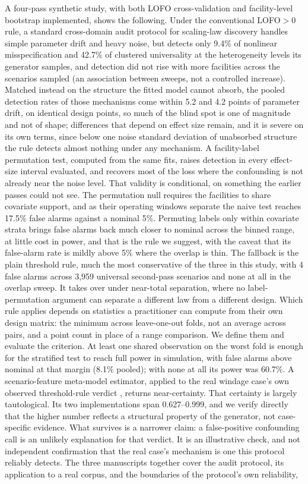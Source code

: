 \documentclass[journal=dce]{CUP-JNL-DTM}%
\begin{document}
A four-pass synthetic study, with both LOFO cross-validation and facility-level bootstrap implemented, shows the following. Under the conventional LOFO$>0$ rule, a standard cross-domain audit protocol for scaling-law discovery handles simple parameter drift and heavy noise, but detects only 9.4\% of nonlinear misspecification and 42.7\% of clustered universality at the heterogeneity levels its generator samples, and detection did not rise with more facilities across the scenarios sampled (an association between sweeps, not a controlled increase). Matched instead on the structure the fitted model cannot absorb, the pooled detection rates of those mechanisms come within 5.2 and 4.2 points of parameter drift, on identical design points, so much of the blind spot is one of magnitude and not of shape; differences that depend on effect size remain, and it is severe on its own terms, since below one noise standard deviation of unabsorbed structure the rule detects almost nothing under any mechanism. A facility-label permutation test, computed from the same fits, raises detection in every effect-size interval evaluated, and recovers most of the loss where the confounding is not already near the noise level. That validity is conditional, on something the earlier passes could not see. The permutation null requires the facilities to share covariate support, and as their operating windows separate the naive test reaches 17.5\% false alarms against a nominal 5\%. Permuting labels only within covariate strata brings false alarms back much closer to nominal across the binned range, at little cost in power, and that is the rule we suggest, with the caveat that its false-alarm rate is mildly above 5\% where the overlap is thin. The fallback is the plain threshold rule, much the most conservative of the three in this study, with 4 false alarms across 3,959 universal second-pass scenarios and none at all in the overlap sweep. It takes over under near-total separation, where no label-permutation argument can separate a different law from a different design. Which rule applies depends on statistics a practitioner can compute from their own design matrix: the minimum across leave-one-out folds, not an average across pairs, and a point count in place of a range comparison. We define them and evaluate the criterion. At least one shared observation on the worst fold is enough for the stratified test to reach full power in simulation, with false alarms above nominal at that margin (8.1\% pooled); with none at all its power was 60.7\%. A scenario-feature meta-model estimator, applied to the real windage case's own observed threshold-rule verdict \citep{gilruiz2026paper1,gilruiz2026paper2}, returns near-certainty. That certainty is largely tautological. Its two implementations span 0.627--0.999, and we verify directly that the higher number reflects a structural property of the generator, not case-specific evidence. What survives is a narrower claim: a false-positive confounding call is an unlikely explanation for that verdict. It is an illustrative check, and not independent confirmation that the real case's mechanism is one this protocol reliably detects. The three manuscripts together cover the audit protocol, its application to a real corpus, and the boundaries of the protocol's own reliability, 
\end{document}
